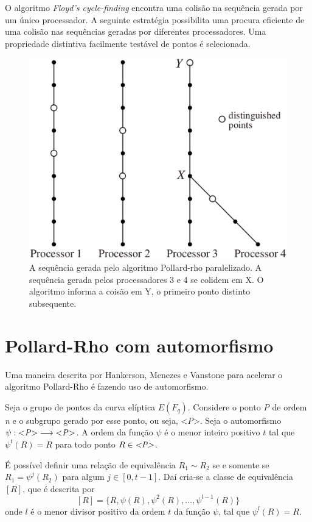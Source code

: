 O algoritmo \textit{Floyd's cycle-finding} encontra uma colisão na sequência gerada por um único processador. A seguinte estratégia possibilita uma procura eficiente de uma colisão nas sequências geradas por diferentes processadores. Uma propriedade distintiva facilmente testável de pontos é selecionada.

\begin{figure}[h]
\centering
\includegraphics[scale=0.5, bb=0 0 737 604]{figuras/paralellized.eps}
\caption{A sequência gerada pelo algoritmo Pollard-rho paralelizado. A sequência gerada pelos processadores 3 e 4 se colidem em X. O algoritmo informa a coisão em Y, o primeiro ponto distinto subsequente.}
\label{fig:paralellized}
\end{figure}


%
%
\section{Pollard-Rho com automorfismo}

Uma maneira descrita por Hankerson, Menezes e Vanstone para acelerar o algoritmo Pollard-Rho é fazendo uso de automorfismo.\cite{Guide}

Seja o grupo de pontos da curva elíptica $E(F_q)$. Considere o ponto \textit{P} de ordem \textit{n} e o subgrupo gerado por esse ponto, ou seja, <\textit{P}>. Seja o automorfismo $\psi: \mbox{<\textit{P}>}\longrightarrow \mbox{<\textit{P}>}$. A ordem da função $\psi$ é o menor inteiro positivo $t$ tal que $\psi^t(R) = R$ para todo ponto $R \in \mbox{\textit{<P>}}$.

É possível definir uma relação de equivalência $R_1 \sim R_2$ se e somente se $R_1 = \psi^j(R_2)$ para algum $j \in [0, t - 1]$. Daí cria-se a classe de equivalência $[R]$, que é descrita por
$$
[R] = \{R, \psi(R), \psi^2(R), \dots, \psi^{l-1}(R)\}
$$
onde $l$ é o menor divisor positivo da ordem $t$ da função $\psi$, tal que $\psi^l(R) = R$.
